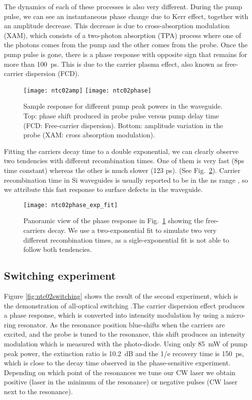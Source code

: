 The dynamics of each of these processes is also very different. During the pump pulse, we can see an instantaneous phase change due to Kerr effect, together with an amplitude decrease. This decrease is due to cross-absorption modulation (XAM), which consists of a two-photon absorption (TPA) process where one of the photons comes from the pump and the other comes from the probe. Once the pump pulse is gone, there is a phase response with opposite sign that remains for more than 100~ps. This is due to the carrier plasma effect, also known as free-carrier dispersion (FCD).

\begin{figure}[htb]
    \centering
    \texttt{[image: ntc02amp]}
    \texttt{[image: ntc02phase]}
    \caption{Sample response for different pump peak powers in the waveguide. Top: phase shift produced in probe pulse versus pump delay time (FCD: Free-carrier dispersion). Bottom: amplitude variation in the probe (XAM: cross absorption modulation).}
    \label{fig:ntc02TimeResSwitching}
\end{figure}

Fitting the carriers decay time to a double exponential, we can clearly observe two tendencies with different recombination times. One of them is very fast (8ps time constant) whereas the other is much slower (123 ps). (See Fig.~\ref{fig:zoomTimeResNtc02Switching}). Carrier recombination time in Si waveguides is usually reported to be in the ns range \cite{Almeida2004b,Xu2007}, so we attribute this fast response to surface defects in the waveguide.

\begin{figure}[htb]
    \centering
    \texttt{[image: ntc02phase\_exp\_fit]}
    \caption{Panoramic view of the phase response in Fig.~\ref{fig:ntc02TimeResSwitching} showing the free-carriers decay. We use a two-exponential fit to simulate two very different recombination times, as a sigle-exponential fit is not able to follow both tendencies.}
    \label{fig:zoomTimeResNtc02Switching}
\end{figure}


\subsection{Switching experiment}
Figure \ref{fig:ntc02switching} shows the result of the second experiment, which is the demonstration of all-optical switching \cite{Oton}.The carrier dispersion effect produces a phase response, which is converted into intensity modulation by using a micro-ring resonator. As the resonance position blue-shifts when the carriers are excited, and the probe is tuned to the resonance, this shift produces an intensity modulation which is measured with the photo-diode. Using only 85~mW of pump peak power, the extinction ratio is 10.2~dB and the 1/e recovery time is 150~ps, which is close to the decay time observed in the phase-sensitive experiment. Depending on which point of the resonances we tune our CW laser we obtain positive (laser in the minimum of the resonance) or negative pulses (CW laser next to the resonance).  


